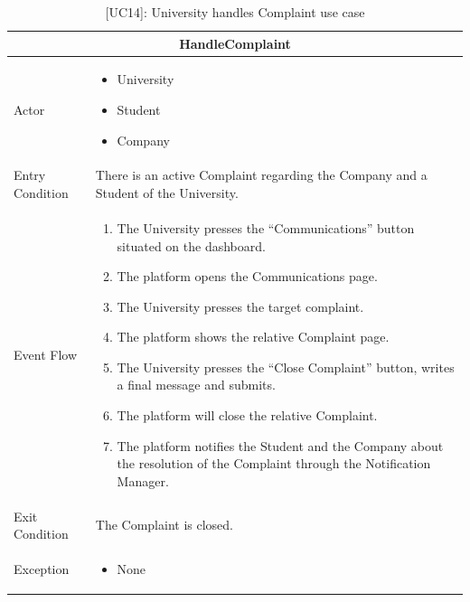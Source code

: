 \begin{table}[H]
    \centering
    \begin{tabular}{|p{3cm}|p{12cm}|}
    \hline
    \multicolumn{2}{|c|}{\textbf{HandleComplaint}} \\ \hline
    Actor & 
    \begin{itemize}
        \item University
        \item Student
        \item Company
    \end{itemize}\\ \hline
    Entry Condition & There is an active Complaint regarding the Company and a Student of the University.\\ \hline
    Event Flow &      
    \begin{enumerate}         
        \item The University presses the “Communications” button situated on the dashboard.
        \item The platform opens the Communications page.
        \item The University presses the target complaint.
        \item The platform shows the relative Complaint page.
        \item The University presses the “Close Complaint” button, writes a final message and submits.
        \item The platform will close the relative Complaint.
        \item The platform notifies the Student and the Company about the resolution of the Complaint through the Notification Manager.
    \end{enumerate} \\ \hline
    Exit Condition & The Complaint is closed.\\ \hline
    Exception & 
    \begin{itemize}         
        \item None
    \end{itemize} \\ \hline    
    \end{tabular}
    \caption{[UC14]: University handles Complaint use case}
    \label{tab:UC14}
\end{table}

